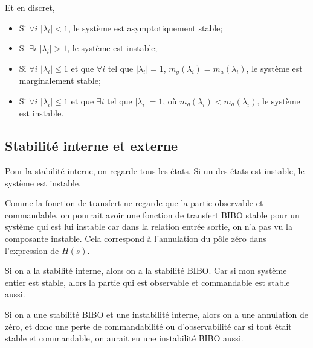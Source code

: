 Et en discret,
\begin{itemize}
  \item Si $\forall i$ $|\lambda_i| < 1$, le système est asymptotiquement
    stable;
  \item Si $\exists i$ $|\lambda_i| > 1$, le système est instable;
  \item Si $\forall i$ $|\lambda_i| \leq 1$ et que $\forall i$ tel que
    $|\lambda_i| = 1$, $m_g(\lambda_i) = m_a(\lambda_i)$,
    le système est marginalement stable;
  \item Si $\forall i$ $|\lambda_i| \leq 1$ et que $\exists i$ tel que
    $|\lambda_i| = 1$, où $m_g(\lambda_i) < m_a(\lambda_i)$,
    le système est instable.
\end{itemize}

\subsection{Stabilité interne et externe}
Pour la stabilité interne, on regarde tous les états.
Si un des états est instable, le système est instable.

Comme la fonction de transfert ne regarde que
la partie observable et commandable,
on pourrait avoir une fonction de transfert
BIBO stable pour un système qui est
lui instable car dans la relation entrée sortie,
on n'a pas vu la composante instable.
Cela correspond à l'annulation du pôle zéro dans l'expression de $H(s)$.

Si on a la stabilité interne, alors on a la stabilité BIBO.
Car si mon système entier est stable,
alors la partie qui est observable et commandable est stable aussi.

Si on a une stabilité BIBO et une instabilité interne,
alors on a une annulation de zéro,
et donc une perte de commandabilité ou d'observabilité
car si tout était stable et commandable,
on aurait eu une instabilité BIBO aussi.

%

